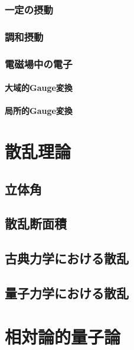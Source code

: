 \documentclass{report}
\begin{document}
      \subsection{一定の摂動}
        
      \subsection{調和摂動}
        
      \subsection{電磁場中の電子}
        
        \subsubsection{大域的Gauge変換}
          
        \subsubsection{局所的Gauge変換}
          
  \chapter{散乱理論}
    \section{立体角}
      
    \section{散乱断面積}
      
    \section{古典力学における散乱}
      
    \section{量子力学における散乱}
  \chapter{相対論的量子論}
\end{document}
